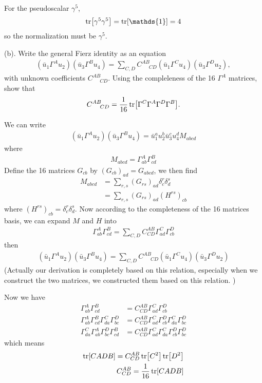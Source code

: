\documentclass{article}
\begin{document}
For the pseudoscalar $\gamma^5$,
\begin{align*}
  \tr[\gamma^5\gamma^5]=\tr[\mathds{1}]=4
\end{align*}
so the normalization must be $\gamma^5$.

(b). Write the general Fierz identity as an equation
\begin{align}
  (\bar u_1\Gamma^Au_2)(\bar u_3\Gamma^Bu_4)=\sum_{C,D}C^{AB}_{\;\;\;\;\;CD}(\bar u_1\Gamma^Cu_4)(\bar u_3\Gamma^Du_2),
\end{align}
with unknown coefficients $C^{AB}_{\;\;\;\;\;CD}$. Using the compleleness of the 16 $\Gamma^A$ matrices, show that
\begin{align}
  C^{AB}_{\;\;\;\;\;CD}=\frac{1}{16}\tr[\Gamma^C\Gamma^A\Gamma^D\Gamma^B].
\end{align}

We can write
\begin{align*}
  (\bar u_1\Gamma^Au_2)(\bar u_3\Gamma^Bu_4)=\bar u^a_1u_2^b\bar u^c_3 u^d_4M_{abcd}
\end{align*}
where
\begin{align*}
  M_{abcd}=\Gamma^A_{ab}\Gamma^B_{cd}
\end{align*}
Define the 16 matrices $G_{cb}$ by $(G_{cb})_{ad}=G_{abcd}$, we then find
\begin{align*}
  M_{abcd}&=\sum_{r,s}(G_{rs})_{ad}\delta^r_c\delta^s_d\\
  &=\sum_{r,s}(G_{rs})_{ad}(H^{rs})_{cb}
\end{align*}
where $(H^{rs})_{cb}=\delta^r_c\delta^s_d$. Now according to the completeness of the 16 matrices basis, we can expand $M$ and $H$ into
\begin{align*}
  \Gamma^A_{ab}\Gamma^B_{cd}=\sum_{C,D}C^{AB}_{CD}\Gamma^C_{ad}\Gamma^D_{cb}
\end{align*}
then
\begin{align*}
  (\bar u_1\Gamma^Au_2)(\bar u_3\Gamma^Bu_4)=\sum_{C,D}C^{AB}_{\;\;\;\;\;CD}(\bar u_1\Gamma^Cu_4)(\bar u_3\Gamma^Du_2)
\end{align*}
(Actually our derivation is completely based on this relation, especially when we construct the two matrices, we constructed them based on this relation. )

Now we have
\begin{align*}
  \Gamma^A_{ab}\Gamma^B_{cd}&=C^{AB}_{CD}\Gamma^C_{ad}\Gamma^D_{cb}\\
  \Gamma^A_{ab}\Gamma^B_{cd}\Gamma^C_{da}\Gamma^D_{bc}&=C^{AB}_{CD}\Gamma^C_{ad}\Gamma^D_{cb}\Gamma^C_{da}\Gamma^D_{bc}\\
  \Gamma^C_{da}\Gamma^A_{ab}\Gamma^D_{bc}\Gamma^B_{cd}&=C^{AB}_{CD}\Gamma^C_{ad}\Gamma^C_{da}\Gamma^D_{cb}\Gamma^D_{bc}
\end{align*}
which means
\begin{align*}
  \tr[CADB]=C^{AB}_{CD}\tr[C^2]\tr[D^2]\\
  C^{AB}_{CD}=\frac{1}{16}\tr[CADB]
\end{align*}
\end{document}

